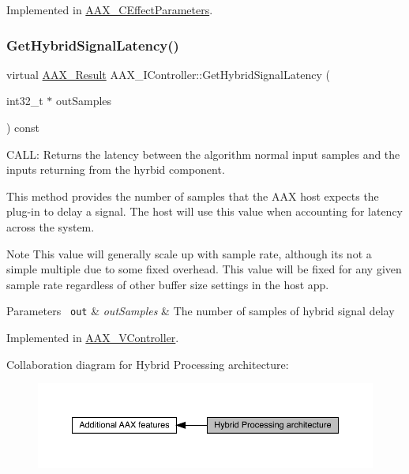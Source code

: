 Implemented in \mbox{\hyperlink{a01481_a2b68c51ddd302b43c0df250fdd3ba239}{A\+A\+X\+\_\+\+C\+Effect\+Parameters}}.

\mbox{\label{a00805_ga47b471c438fcad0798964b860d74609e}} 
\subsubsection{\texorpdfstring{GetHybridSignalLatency()}{GetHybridSignalLatency()}}
{\footnotesize\ttfamily virtual \mbox{\hyperlink{a00392_a4d8f69a697df7f70c3a8e9b8ee130d2f}{A\+A\+X\+\_\+\+Result}} A\+A\+X\+\_\+\+I\+Controller\+::\+Get\+Hybrid\+Signal\+Latency (\begin{DoxyParamCaption}\item[{int32\+\_\+t $\ast$}]{out\+Samples }\end{DoxyParamCaption}) const\hspace{0.3cm}{\ttfamily [pure virtual]}}



C\+A\+LL\+: Returns the latency between the algorithm normal input samples and the inputs returning from the hyrbid component. 

This method provides the number of samples that the A\+AX host expects the plug-\/in to delay a signal. The host will use this value when accounting for latency across the system.

\begin{DoxyNote}{Note}
This value will generally scale up with sample rate, although it\textquotesingle{}s not a simple multiple due to some fixed overhead. This value will be fixed for any given sample rate regardless of other buffer size settings in the host app.
\end{DoxyNote}

\begin{DoxyParams}[1]{Parameters}
\mbox{\texttt{ out}}  & {\em out\+Samples} & The number of samples of hybrid signal delay \\
\hline
\end{DoxyParams}


Implemented in \mbox{\hyperlink{a01905_abc03b972e785569e1a0e89a12a6ed372}{A\+A\+X\+\_\+\+V\+Controller}}.

Collaboration diagram for Hybrid Processing architecture\+:
\nopagebreak
\begin{figure}[H]
\begin{center}
\leavevmode
\includegraphics[width=350pt]{a00805}
\end{center}
\end{figure}
